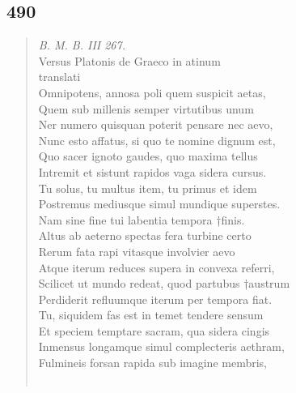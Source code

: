 \documentclass[11pt, a4paper]{report}
\begin{document}
            \subsection*{490}
      \begin{verse}
      \textit{B. M. B. III 267.} \\ Versus Platonis de Graeco in atinum \\ translati \\ Omnipotens, annosa poli quem suspicit aetas, \\ Quem sub millenis semper virtutibus unum \\ Ner numero quisquan poterit pensare nec aevo, \\ Nunc esto affatus, si quo te nomine dignum est, \\ Quo sacer ignoto gaudes, quo maxima tellus \\ Intremit et sistunt rapidos vaga sidera cursus. \\ Tu solus, tu multus item, tu primus et idem \\ Postremus mediusque simul mundique superstes. \\ Nam sine fine tui labentia tempora †finis. \\ Altus ab aeterno spectas fera turbine certo \\ Rerum fata rapi vitasque involvier aevo \\ Atque iterum reduces supera in convexa referri, \\ Scilicet ut mundo redeat, quod partubus †austrum \\ Perdiderit refluumque iterum per tempora fiat. \\ Tu, siquidem fas est in temet tendere sensum \\ Et speciem temptare sacram, qua sidera cingis \\ Inmensus longamque simul complecteris aethram, \\ Fulmineis forsan rapida sub imagine membris, \\ 
        ﻿\pagebreak 

\end{verse}
\end{document}
